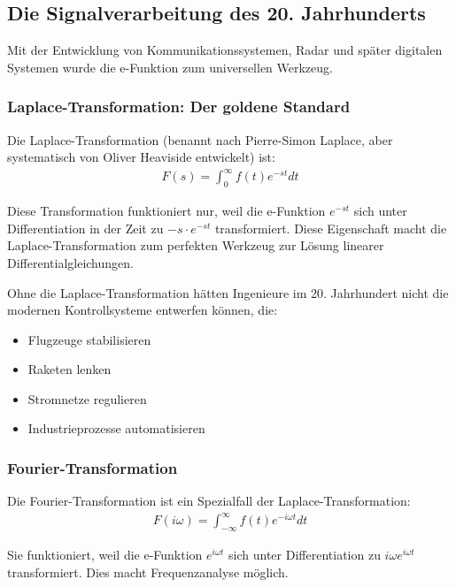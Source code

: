 \documentclass[a4paper,12pt,twoside]{report}
\theoremstyle{definition}
\begin{document}
\subsection{Die Signalverarbeitung des 20. Jahrhunderts}

Mit der Entwicklung von Kommunikationssystemen, Radar und später digitalen Systemen wurde die e-Funktion zum universellen Werkzeug.

\subsubsection*{Laplace-Transformation: Der goldene Standard}

Die Laplace-Transformation (benannt nach Pierre-Simon Laplace, aber systematisch von Oliver Heaviside entwickelt) ist:
\begin{align}
	F(s) = \int_0^{\infty} f(t) e^{-st} dt
\end{align}

Diese Transformation funktioniert nur, weil die e-Funktion $e^{-st}$ sich unter Differentiation in der Zeit zu $-s \cdot e^{-st}$ transformiert. Diese Eigenschaft macht die Laplace-Transformation zum perfekten Werkzeug zur Lösung linearer Differentialgleichungen.

Ohne die Laplace-Transformation hätten Ingenieure im 20. Jahrhundert nicht die modernen Kontrollsysteme entwerfen können, die:
\begin{itemize}
	\item[-] Flugzeuge stabilisieren
	\item[-] Raketen lenken
	\item[-] Stromnetze regulieren
	\item[-] Industrieprozesse automatisieren
\end{itemize}

\subsubsection*{Fourier-Transformation}

Die Fourier-Transformation ist ein Spezialfall der Laplace-Transformation:
\begin{align}
	F(i\omega) = \int_{-\infty}^{\infty} f(t) e^{-i\omega t} dt
\end{align}

Sie funktioniert, weil die e-Funktion $e^{i\omega t}$ sich unter Differentiation zu $i\omega e^{i\omega t}$ transformiert. Dies macht Frequenzanalyse möglich.
\end{document}
